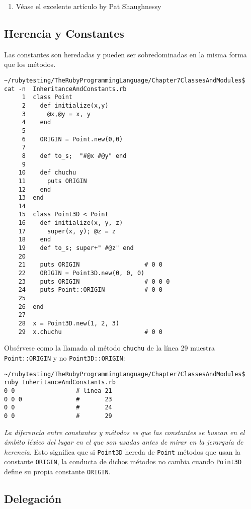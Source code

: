 \begin{enumerate}
\item 
Véase  el excelente artículo
 by Pat Shaughnessy 
\end{enumerate}

\subsection{Herencia y Constantes}
Las constantes son heredadas y pueden ser sobredominadas en la misma forma que los métodos.

\begin{verbatim}
~/rubytesting/TheRubyProgrammingLanguage/Chapter7ClassesAndModules$ cat -n  InheritanceAndConstants.rb 
     1  class Point
     2    def initialize(x,y)
     3      @x,@y = x, y
     4    end
     5  
     6    ORIGIN = Point.new(0,0)   
     7  
     8    def to_s;  "#@x #@y" end
     9  
    10    def chuchu
    11      puts ORIGIN
    12    end
    13  end
    14  
    15  class Point3D < Point
    16    def initialize(x, y, z)
    17      super(x, y); @z = z
    18    end
    19    def to_s; super+" #@z" end
    20  
    21    puts ORIGIN                  # 0 0
    22    ORIGIN = Point3D.new(0, 0, 0)
    23    puts ORIGIN                  # 0 0 0
    24    puts Point::ORIGIN           # 0 0
    25  
    26  end
    27  
    28  x = Point3D.new(1, 2, 3)
    29  x.chuchu                       # 0 0
\end{verbatim}
Obsérvese como la llamada al método \verb|chuchu|
de la línea 29  muestra \verb|Point::ORIGIN| y no
\verb|Point3D::ORIGIN|:

\begin{verbatim}
~/rubytesting/TheRubyProgrammingLanguage/Chapter7ClassesAndModules$ ruby InheritanceAndConstants.rb 
0 0                 # linea 21
0 0 0               #       23
0 0                 #       24
0 0                 #       29
\end{verbatim}
\emph{La diferencia entre constantes y métodos es que las constantes se buscan en el ámbito 
léxico del lugar en el que son usadas antes de mirar en la jerarquía de herencia}.
Esto significa que si \verb|Point3D| hereda de 
\verb|Point| métodos que usan la constante \verb|ORIGIN|, la conducta de dichos métodos no cambia 
cuando \verb|Point3D| define su propia constante \verb|ORIGIN|.

\subsection{Delegación}

